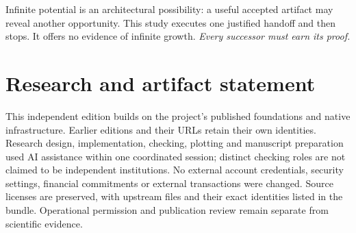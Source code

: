 \documentclass[11pt,letterpaper]{article}
\begin{document}
Infinite potential is an architectural possibility: a useful accepted artifact may reveal another opportunity. This study executes one justified handoff and then stops. It offers no evidence of infinite growth. \emph{Every successor must earn its proof.}

\section*{Research and artifact statement}
This independent edition builds on the project's published foundations and native infrastructure. Earlier editions and their URLs retain their own identities. Research design, implementation, checking, plotting and manuscript preparation used AI assistance within one coordinated session; distinct checking roles are not claimed to be independent institutions. No external account credentials, security settings, financial commitments or external transactions were changed. Source licenses are preserved, with upstream files and their exact identities listed in the bundle. Operational permission and publication review remain separate from scientific evidence.

\FloatBarrier
\clearpage
{\small\raggedright


}
\end{document}
